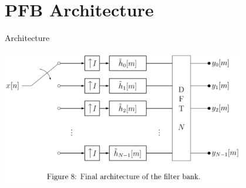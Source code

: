 \documentclass[ignorenonframetext,12pt]{beamer}
\begin{document}
\section{PFB Architecture}
\begin{frame}{Architecture}
				\begin{center}
								\includegraphics[width=0.8\textwidth]{PFB_OVS_final_architecture}
				\end{center}
\end{frame}
\end{document}
